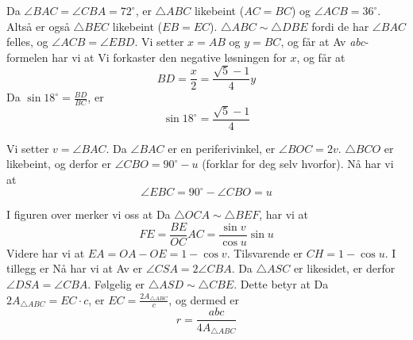 




	\footnotesize
\opgt

Da $ \angle BAC=\angle CBA=72^\circ $, er $ \triangle ABC $ likebeint ($ AC=BC $) og $ \angle ACB= 36^\circ $. Altså er også $ \triangle BEC $ likebeint ($ EB=EC $). $ \triangle ABC \sim \triangle DBE$ fordi de har $ \angle BAC $ felles, og $ \angle ACB=\angle EBD $. Vi setter $ x=AB $ og $ y=BC $, og får at
Av \textit{abc}-formelen har vi at
Vi forkaster den negative løsningen for $ x $, og får at
\[BD=\frac{x}{2}=\frac{\sqrt{5}-1}{4}y  \]
Da $ \sin 18^\circ=\frac{BD}{BC} $, er
\[ \sin 18^\circ = \frac{\sqrt{5}-1}{4} \]


Vi setter $ v=\angle BAC $.
Da $ \angle BAC $ er en periferivinkel, er $ \angle BOC=2v $. $ \triangle BCO $ er likebeint, og derfor er $ \angle CBO=90^\circ-u$ (forklar for deg selv hvorfor). Nå har vi at
\[ \angle EBC=90^\circ-\angle CBO=u \]

\newpage
{}
I figuren over merker vi oss at
Da $ \triangle OCA \sim \triangle BEF $, har vi at
\[ FE=\frac{BE}{OC}AC=\frac{\sin v}{\cos u}\sin u \]
Videre har vi at $ EA=OA-OE=1-\cos v $. Tilsvarende er $ CH=1-\cos u $. I tillegg er 
Nå har vi at
\newpage
{}
Av  er $ \angle CSA=2\angle CBA $. Da $ \triangle ASC $ er likesidet, er derfor $ \angle DSA=\angle CBA $. Følgelig er $ \triangle ASD\sim \triangle CBE $. Dette betyr at
Da $ 2A_{\triangle ABC}=EC\cdot c $, er $ EC=\frac{2A_{\triangle ABC}}{c} $, og dermed er
\[ r=\frac{abc}{4A_{\triangle ABC}} \]


